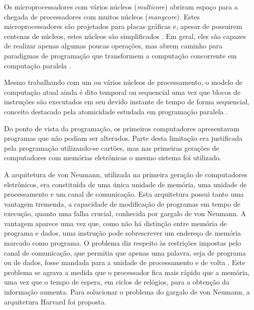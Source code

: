 \documentclass[11pt,a4paper,oneside]{book}
\begin{document}
Os microprocessadores com v\'arios n\'ucleos (\textit{multicore}) abriram espa\c{c}o para a chegada de processadores com muitos n\'ucleos (\textit{manycore}).
Estes microprocessadores s\~ao projetados para placas gr\'aficas e, apesar de possuirem centenas de n\'ucleos, estes núcleos s\~ao simplificados \cite{Vajda2011}.
Em geral, eles são capazes de realizar apenas algumas poucas operações, mas abrem caminho para paradigmas de programação que transformem a computação concorrente em computação paralela \cite{Harel2004}.

Mesmo trabalhando com um ou v\'arios n\'ucleos de processamento, o modelo de computa\c{c}\~ao atual ainda \'e dito temporal ou sequencial uma vez que blocos de instru\c{c}\~oes s\~ao executados em seu devido instante de tempo de forma sequencial, conceito destacado pela atomicidade estudada em programa\c{c}\~ao paralela \cite{williams2012c++}.

Do ponto de vista da programa\c{c}\~ao, os primeiros computadores apresentavam programas que n\~ao podiam ser alterados.
Parte desta limita\c{c}\~ao era justificada pela programa\c{c}\~ao utilizando-se cart\~oes, mas nas primeiras gera\c{c}\~oes de computadores com mem\'orias eletr\^onicas o mesmo sistema foi utilizado.

A arquitetura de von Neumann, utilizada na primeira gera\c{c}\~ao de computadores eletr\^onicos, era cons\-ti\-tu\'i\-­da de uma \'unica unidade de mem\'oria, uma unidade de processamento e um canal de comunica\c{c}\~ao.
Esta arquitetura possui tanto uma vantagem tremenda, a capacidade de modifica\c{c}\~ao de programas em tempo de execu\c{c}\~ao, quanto uma falha crucial, conhecida por gargalo de von Neumann.
A vantagem aparece uma vez que, como n\~ao h\'a distin\c{c}\~ao entre mem\'oria de programa e dados, uma instru\c{c}\~ao pode sobrescrever um endere\c{c}o de mem\'oria marcado como programa.
O problema diz respeito \`as restri\c{c}\~oes impostas pelo canal de comunica\c{c}\~ao, que permitia que apenas uma palavra, seja de programa ou de dados, fosse mandada para a unidade de processamento e de volta \cite{Backus1978}.
Este problema se agrava a medida que o processador fica mais r\'apido que a mem\'oria, uma vez que o tempo de espera, em ciclos de rel\'ogios, para a obten\c{c}\~ao da informa\c{c}\~ao aumenta.
Para solucionar o problema do gargalo de von Neumann, a arquitetura Harvard foi proposta.
\end{document}

